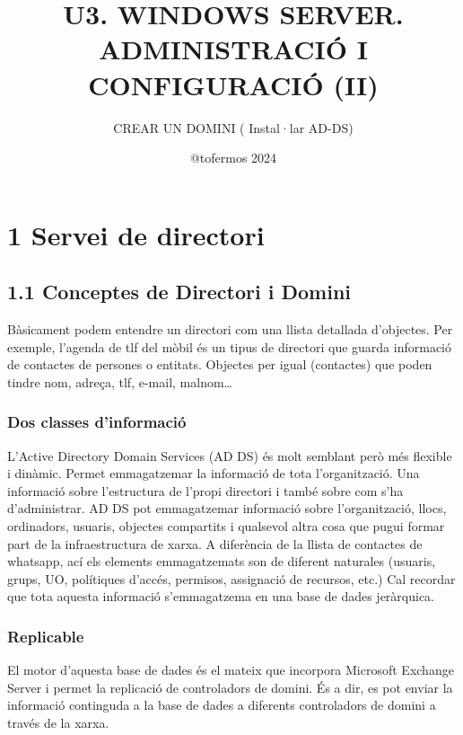 \documentclass[
  a4paper,
]{article}
\title{U3. WINDOWS SERVER. ADMINISTRACIÓ I CONFIGURACIÓ (II)}
\subtitle{CREAR UN DOMINI ( Instal·lar AD-DS)}
\author{@tofermos 2024}
\date{}
\begin{document}
\maketitle

{
\setcounter{tocdepth}{2}
\tableofcontents
}
\newpage
\renewcommand\tablename{Tabla}

\section{1 Servei de directori}\label{servei-de-directori}

\subsection{1.1 Conceptes de Directori i
Domini}\label{conceptes-de-directori-i-domini}

Bàsicament podem entendre un directori com una llista detallada
d'objectes. Per exemple, l'agenda de tlf del mòbil és un tipus de
directori que guarda informació de contactes de persones o entitats.
Objectes per igual (contactes) que poden tindre nom, adreça, tlf,
e-mail, malnom\ldots{}

\subsubsection{Dos classes
d'informació}\label{dos-classes-dinformaciuxf3}

L'Active Directory Domain Services (AD DS) és molt semblant però més
flexible i dinàmic. Permet emmagatzemar la informació de tota
l'organització. Una informació sobre l'estructura de l'propi directori i
també sobre com s'ha d'administrar. AD DS pot emmagatzemar informació
sobre l'organització, llocs, ordinadors, usuaris, objectes compartits i
qualsevol altra cosa que pugui formar part de la infraestructura de
xarxa. A diferència de la llista de contactes de whatsapp, ací els
elements emmagatzemats son de diferent naturales (usuaris, grups, UO,
polítiques d'accés, permisos, assignació de recursos, etc.) Cal recordar
que tota aquesta informació s'emmagatzema en una base de dades
jeràrquica.

\subsubsection{Replicable}\label{replicable}

El motor d'aquesta base de dades és el mateix que incorpora Microsoft
Exchange Server i permet la replicació de controladors de domini. És a
dir, es pot enviar la informació continguda a la base de dades a
diferents controladors de domini a través de la xarxa.
\end{document}
